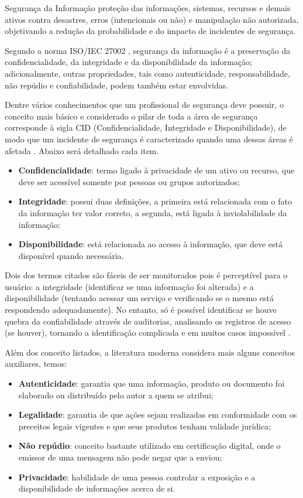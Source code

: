 \documentclass[
	12pt,				
	openright,		
	twoside,	
	a4paper,
	english,	
	brazil	
	]{abntex2}
\begin{document}
Segurança da Informação proteção das informações, sistemas, recursos e demais ativos contra desastres, erros (intencionais ou não) e manipulação não autorizada, objetivando a redução da probabilidade e do impacto de incidentes de segurança.

Segundo a norma ISO/IEC 27002 \cite{isoiec27002}, segurança da informação é a preservação da confidencialidade, da integridade e da disponibilidade da informação; adicionalmente, outras propriedades, tais como autenticidade, responsabilidade, não repúdio e confiabilidade, podem também estar envolvidas.

Dentre vários conhecimentos que um profissional de segurança deve possuir, o conceito mais básico e considerado o pilar de toda a área de segurança corresponde à sigla CID (Confidencialidade, Integridade e Disponibilidade), de modo que um incidente de segurança é caracterizado quando uma dessas áreas é afetada \cite{seg-redes-sistemas}. Abaixo será detalhado cada item.

\begin{itemize}
 \item \textbf{Confidencialidade}: termo ligado à privacidade de um ativo ou recurso, que deve ser acessível somente por pessoas ou grupos autorizados;
 \item \textbf{Integridade}: possui duas definições, a primeira está relacionada com o fato da informação ter valor correto, a segunda, está ligada à inviolabilidade da informação;
 \item \textbf{Disponibilidade}: está relacionada ao acesso à informação, que deve está disponível quando necessária.
\end{itemize}

Dois dos termos citados são fáceis de ser monitorados pois é perceptível para o usuário: a integridade (identificar se uma informação foi alterada) e a disponibilidade (tentando acessar um serviço e verificando se o mesmo está respondendo adequadamente). No entanto, só é possível identificar se houve quebra da confiabilidade através de auditorias, analisando os registros de acesso (se houver), tornando a identificação complicada e em muitos casos impossível \cite{seg-redes-sistemas}.

Além dos conceito listados, a literatura moderna considera mais alguns conceitos auxiliares, temos:

\begin{itemize}
 \item \textbf{Autenticidade}: garantia que uma informação, produto ou documento foi elaborado ou distribuído pelo autor a quem se atribui;
 \item \textbf{Legalidade}: garantia de que ações sejam realizadas em conformidade com os preceitos legais vigentes e que seus produtos tenham validade jurídica;
 \item \textbf{Não repúdio}: conceito bastante utilizado em certificação digital, onde o emissor de uma mensagem não pode negar que a enviou;
 \item \textbf{Privacidade}: habilidade de uma pessoa controlar a exposição e a disponibilidade de informações acerca de si.
\end{itemize}
\end{document}
